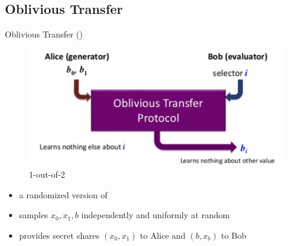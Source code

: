 \subsection{Oblivious Transfer}
\begin{frame}{Oblivious Transfer (\OT)}
	\begin{figure}
		\begin{center}
			\includegraphics[scale = 0.5]{OT-1}
		\end{center}
	\caption{1-out-of-2 \OT}
	\end{figure}
	
	\pause
	
	\begin{definition}
	\begin{itemize}
		\item a randomized version of \OT
		\item samples $ x_0, x_1, b  $ independently and uniformly at random 
		\item provides secret shares $ (x_0, x_1) $ to Alice and $ (b, x_b) $ to Bob
	\end{itemize}
	\end{definition}
\end{frame}

